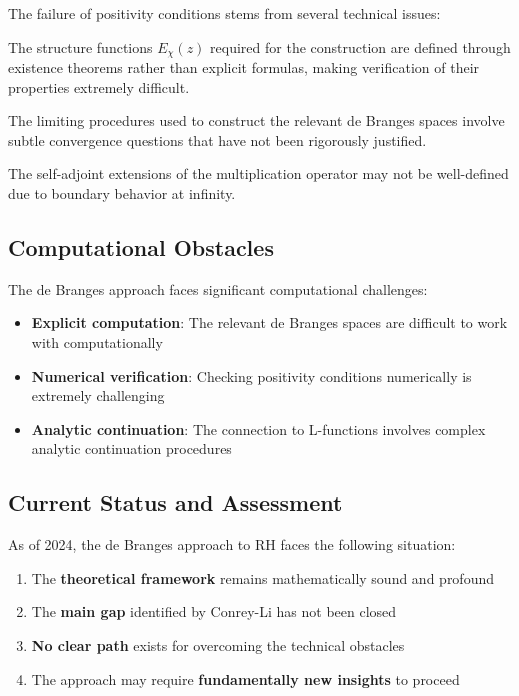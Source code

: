 The failure of positivity conditions stems from several technical issues:

\begin{problem}
The structure functions $E_\chi(z)$ required for the construction are defined through existence theorems rather than explicit formulas, making verification of their properties extremely difficult.
\end{problem}

\begin{problem}
The limiting procedures used to construct the relevant de Branges spaces involve subtle convergence questions that have not been rigorously justified.
\end{problem}

\begin{problem}
The self-adjoint extensions of the multiplication operator may not be well-defined due to boundary behavior at infinity.
\end{problem}

\subsection{Computational Obstacles}

The de Branges approach faces significant computational challenges:

\begin{itemize}
\item \textbf{Explicit computation}: The relevant de Branges spaces are difficult to work with computationally
\item \textbf{Numerical verification}: Checking positivity conditions numerically is extremely challenging  
\item \textbf{Analytic continuation}: The connection to L-functions involves complex analytic continuation procedures
\end{itemize}

\subsection{Current Status and Assessment}

\begin{assessment}
As of 2024, the de Branges approach to RH faces the following situation:
\begin{enumerate}
\item The \textbf{theoretical framework} remains mathematically sound and profound
\item The \textbf{main gap} identified by Conrey-Li has not been closed
\item \textbf{No clear path} exists for overcoming the technical obstacles
\item The approach may require \textbf{fundamentally new insights} to proceed
\end{enumerate}
\end{assessment}

